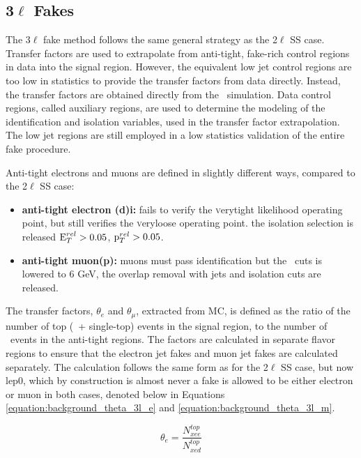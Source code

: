 



\subsection{3$\ell$ Fakes}

The 3$\ell$ fake method follows the same general strategy as the 2$\ell$ SS case. Transfer factors are used to extrapolate from anti-tight, fake-rich control regions in data  into the signal region.  However, the equivalent low jet control regions are too low in statistics to provide the transfer factors from data directly. Instead, the transfer factors are obtained directly from the \ttbar\ simulation. Data control regions, called auxiliary regions, are used to determine the modeling of the identification and isolation variables, used in the transfer factor extrapolation. The low jet regions are still employed in a low statistics validation of the entire fake procedure. 

Anti-tight electrons and muons are defined in slightly different ways, compared to the 2$\ell$ SS case:
\begin{itemize}
\item \textbf{ anti-tight electron (d)i:} fails to verify the {\textsc verytight} likelihood operating point, but still verifies the {\textsc veryloose} operating point. the isolation selection is released $\rm E_{T}^{rel}>0.05$,  $\rm p_{T}^{rel}>0.05$.

\item \textbf{ anti-tight muon(p):} muons must pass identification but the \pt\ cuts is lowered to 6 GeV, the overlap removal with jets and isolation cuts are released.
\end{itemize} 
The transfer factors, $\theta_e$ and $\theta_{\mu}$, extracted from MC, is defined as the ratio of the number of top (\ttbar\ + single-top) events in the signal region, to the number of \ttbar\ events in the anti-tight regions. The factors are calculated in separate flavor regions to ensure that the electron jet fakes and muon jet fakes are calculated separately. The calculation follows the same form as for the 2$\ell$ SS case, but now lep0, which by construction is almost never a fake is allowed to be either electron or muon in both cases, denoted below in Equations \ref{equation:background_theta_3l_e} and \ref{equation:background_theta_3l_m}.  

\begin{equation}
\theta_e = \frac{N^{top}_{xee}}{N^{top}_{xed}}
\label{equation:background_theta_3l_e}
\end{equation}


